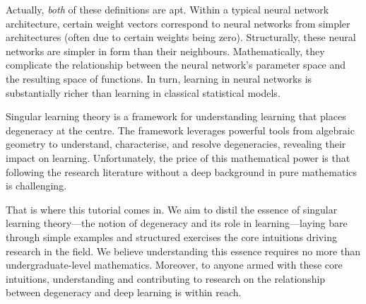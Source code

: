 \documentclass[11pt]{article}
\begin{document}
Actually, \emph{both} of these definitions are apt. Within a typical neural
network architecture, certain weight vectors correspond to neural networks from
simpler architectures (often due to certain weights being zero). Structurally,
these neural networks are simpler in form than their neighbours.
Mathematically, they complicate the relationship between the neural network's
parameter space and the resulting space of functions. In turn, learning in
neural networks is substantially richer than learning in classical statistical
models.

Singular learning theory is a framework for understanding learning that places
degeneracy at the centre. The framework leverages powerful tools from algebraic
geometry to understand, characterise, and resolve degeneracies, revealing their
impact on learning. Unfortunately, the price of this mathematical power is that
following the research literature without a deep background in pure mathematics
is challenging.

That is where this tutorial comes in. We aim to distil the essence of singular
learning theory---the notion of degeneracy and its role in learning---laying
bare through simple examples and structured exercises the core intuitions
driving research in the field. We believe understanding this essence requires
no more than undergraduate-level mathematics. Moreover, to anyone armed with
these core intuitions, understanding and contributing to research on the
relationship between degeneracy and deep learning is within reach.
\end{document}
